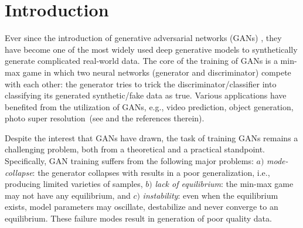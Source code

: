 \documentclass[10pt,twocolumn,letterpaper]{article}
\begin{document}
\section{Introduction}
Ever since the introduction of generative adversarial networks (GANs) \cite{goodfellow2014generative}, they have become one of the most widely used deep generative models to synthetically generate complicated real-world data. The core of the training of GANs is a min-max game in
which two neural networks (generator and discriminator) compete with each other: the generator tries to trick the discriminator/classifier into classifying its generated synthetic/fake data as true. 
Various applications have benefited from the utilization of GANs, e.g., video prediction, object generation, photo super resolution~(see \cite{ledig2017photo,tulyakov2017mocogan} and the references therein).

Despite the interest that GANs have drawn, the task of training GANs remains a challenging problem, both from a theoretical and a practical standpoint. 
{{Specifically, GAN training suffers from the following major problems: $a)$ \textit{mode-collapse}: the generator collapses with results in a poor generalization, i.e., producing limited varieties of samples, $b)$ \textit{lack of equilibrium}: the min-max game may not have any  equilibrium, and $c)$ \textit{instability}: even when the equilibrium exists, model parameters may oscillate, destabilize and never converge to an equilibrium.}} These failure modes result in generation of poor quality data. 
\end{document}
